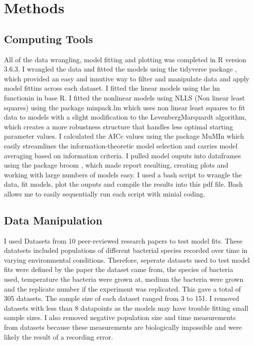 \documentclass[titlepage]{article}
\begin{document}
  \section{Methods}
  
 \subsection {Computing Tools}
All of the data wrangling, model fitting and plotting was completed in R version 3.6.3. I wrangled the data and fitted the models using the tidyverse package \citep{wickham2017tidyverse}, which provided an easy and innutive way to filter and manipulate data and apply model fittins across each dataset. I fitted the linear models using the lm functionin in base R. I fitted the nonlinear models using NLLS (Non linear least squares) using the package minpack.lm \cite{elzhov2016package} which uses non linear least squares to fit data to models with a slight modification to the LevenbergMarquardt algorithm, which creates a more robustness structure that handles less optimal starting parameter values. I calculated the AICc values using the package MuMIn \cite{barton2015package} which easily streamlines the information-theoretic model selection and carries model averaging based on information criteria. I pulled model ouputs into dataframes using the package broom \cite{robinson2014broom}, which made report resulting, creating plots and working with large numbers of models easy. I used a bash script to wrangle the data, fit models, plot the ouputs and compile the results into this pdf file. Bash allows me to easily sequentially run each script with minial coding.


  
  \subsection {Data Manipulation}

I used Datasets from 10 peer-reviewed research papers to test model fits. These datatsets included populations of different bacterial species recorded over time in varying environmental conditions. Therefore, seperate datasets used to test model fits were defined by the paper the dataset came from, the species of bacteria used, temperature the bacteria were grown at, medium the bacteria were grown and the replicate number if the experiment was replicated. This gave a total of 305 datasets. The sample size of each dataset ranged from 3 to 151. I removed datasets with less than 8 datapoints as the models may have trouble fitting small sample sizes. I also removed negative population size and time measurements from datasets because these measurements are biologically impossible and were likely the result of a recording error. 
\end{document}
